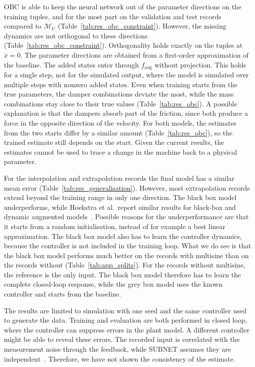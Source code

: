 OBC is able to keep the neural network out of the parameter
directions on the training tuples, and for the most part on the validation and test records
compared to $\mathcal M_{\mathrm U}$ (Table~\ref{tab:res_obc_constraint}).
However, the missing dynamics are not orthogonal to these directions (Table~\ref{tab:res_obc_constraint}).
Orthogonality holds exactly on the tuples at $\bar x=0$.
The parameter directions are obtained from a first-order approximation of the baseline.
The added states enter through $f_{\mathrm{aug}}$ without projection.
This holds for a single step, not for the simulated output, 
where the model is simulated over multiple steps with nonzero added states.
Even when training starts from the true parameters, the
damper combinations deviate the most, while the mass combinations stay close
to their true values (Table~\ref{tab:res_obc}).
A possible explanation is that the dampers absorb part of the friction, 
since both produce a force in the opposite direction of the velocity.
For both models, the estimates from the two starts differ by a similar amount (Table~\ref{tab:res_obc}),
so the trained estimate still depends on the start.
Given the current results, 
the estimates cannot be used to trace a change in the machine back to a physical parameter.

For the interpolation and extrapolation records the final model 
has a similar mean error (Table~\ref{tab:res_generalisation}). 
However, most extrapolation records extend beyond the training range in only one direction.
The black box model underperforms, while Hoekstra et al.\ report similar results for black-box and dynamic augmented models~\cite[Table~8]{hoekstra2026lfr}.
Possible reasons for the underperformance are that it starts from a random initialisation, 
instead of for example a best linear approximation.
The black box model also has to learn the controller dynamics, because
the controller is not included in the training loop.
What we do see is that the black box model performs much better on the records with multisine than on the records without (Table~\ref{tab:app_splits}).
For the records without multisine, the reference is the only input.
The black box model therefore has to learn the complete closed-loop response, while the grey box model uses the known controller and starts from the baseline.

The results are limited to simulation with one seed and the
same controller used to generate the data.
Training and evaluation are both performed in closed loop, 
where the controller can suppress errors in the plant model.
A different controller might be able to reveal these errors. 
The recorded input is correlated with the measurement noise through the feedback, 
while SUBNET assumes they are independent~\cite{beintema2023subnet}.
Therefore, we have not shown the consistency of the estimate.

